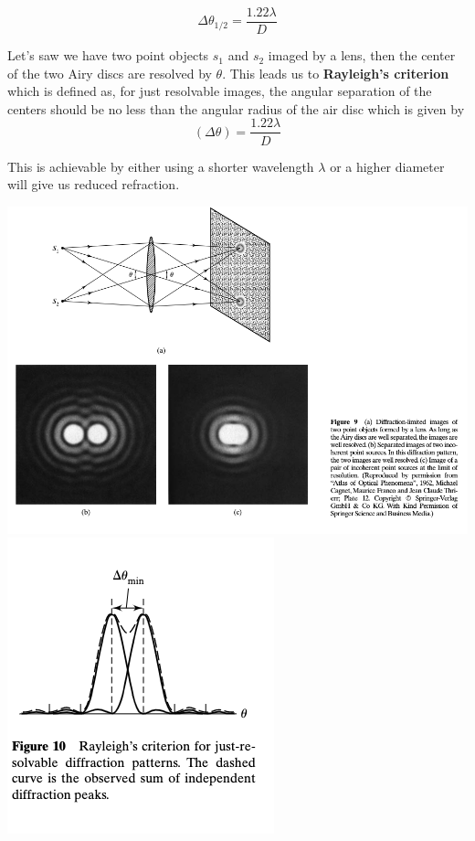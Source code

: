 \documentclass[10pt]{article}
\begin{document}
\[\Delta \theta_{1/2} = \frac{1.22 \lambda}{D}\]

Let's saw we have two point objects $s_1$ and $s_2$ imaged by a lens, then the center of the two Airy discs are resolved by $\theta$. This leads us to \textbf{Rayleigh's criterion} which is defined as, for just resolvable images, the angular separation of the centers should be no less than the angular radius of the air disc which is given by 
\[(\Delta \theta) = \frac{1.22 \lambda}{D}\]

This is achievable by either using a shorter wavelength $\lambda$ or a higher diameter will give us reduced refraction.

\begin{center}
    \includegraphics[scale = 1]{imgs/rayleigh.png}
    \includegraphics[scale = .9]{imgs/fig-10.png}
\end{center}
\end{document}

